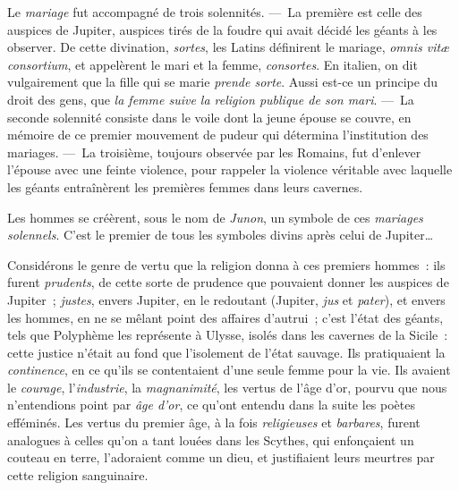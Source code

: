 \documentclass[french,twoside]{book} %
\begin{document}
 Le {\itshape mariage} fut accompagné de trois solennités. — La première est celle des auspices de Jupiter, auspices tirés de la foudre qui avait décidé les géants à les observer. De cette divination, {\itshape sortes}, les Latins définirent le mariage, {\itshape omnis vitæ consortium}, et appelèrent le mari et la femme, {\itshape consortes}. En italien, on dit vulgairement que la fille qui se marie {\itshape prende sorte}. Aussi est-ce un principe du droit des gens, que {\itshape la femme suive la religion publique de son mari}. — La seconde solennité consiste dans le voile dont la jeune épouse se couvre, en mémoire de ce premier mouvement de pudeur qui détermina l’institution des mariages. — La troisième, toujours observée par les Romains, fut d’enlever l’épouse avec une feinte violence, pour rappeler la violence véritable avec laquelle les géants entraînèrent les premières femmes dans leurs cavernes.\par
Les hommes se créèrent, sous le nom de {\itshape Junon}, un symbole de ces {\itshape mariages solennels}. C’est le premier de tous les symboles divins après celui de Jupiter…\par
\par
Considérons le genre de vertu que la religion donna à ces premiers hommes : ils furent {\itshape prudents}, de cette sorte de prudence que pouvaient donner les auspices de Jupiter ; {\itshape justes}, envers Jupiter, en le redoutant (Jupiter, {\itshape jus} et {\itshape pater}), et envers les hommes, en ne se mêlant point des affaires d’autrui ; c’est l’état des géants, tels que Polyphème les représente  à Ulysse, isolés dans les cavernes de la Sicile : cette justice n’était au fond que l’isolement de l’état sauvage. Ils pratiquaient la {\itshape continence}, en ce qu’ils se contentaient d’une seule femme pour la vie. Ils avaient le {\itshape courage}, l’{\itshape industrie}, la {\itshape magnanimité}, les vertus de l’âge d’or, pourvu que nous n’entendions point par {\itshape âge d’or}, ce qu’ont entendu dans la suite les poètes efféminés. Les vertus du premier âge, à la fois {\itshape religieuses} et {\itshape barbares}, furent analogues à celles qu’on a tant louées dans les Scythes, qui enfonçaient un couteau en terre, l’adoraient comme un dieu, et justifiaient leurs meurtres par cette religion sanguinaire.\par
\end{document}
